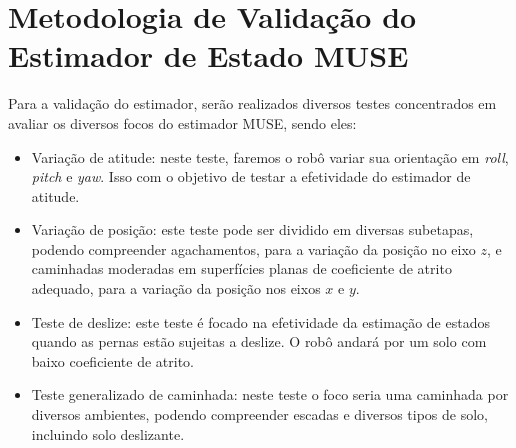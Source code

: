 \section{Metodologia de Validação do Estimador de Estado MUSE}
Para a validação do estimador, serão realizados diversos testes concentrados em avaliar os diversos focos do estimador MUSE, sendo eles:
\begin{itemize}
    \item Variação de atitude: neste teste, faremos o robô variar sua orientação em \textit{roll}, \textit{pitch} e \textit{yaw}. Isso com o objetivo de testar a efetividade do estimador de atitude.
    \item Variação de posição: este teste pode ser dividido em diversas subetapas, podendo compreender agachamentos, para a variação da posição no eixo $z$, e caminhadas moderadas em superfícies planas de coeficiente de atrito adequado, para a variação da posição nos eixos $x$ e $y$.
    \item Teste de deslize: este teste é focado na efetividade da estimação de estados quando as pernas estão sujeitas a deslize. O robô andará por um solo com baixo coeficiente de atrito.
    \item Teste generalizado de caminhada: neste teste o foco seria uma caminhada por diversos ambientes, podendo compreender escadas e diversos tipos de solo, incluindo solo deslizante.
\end{itemize}
